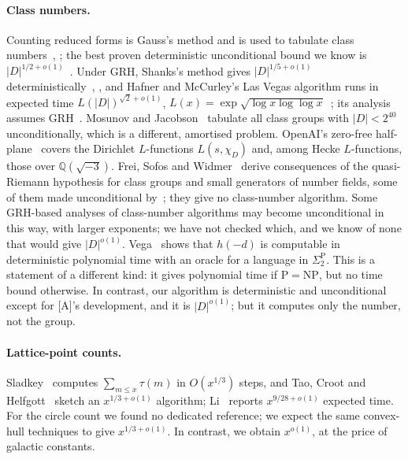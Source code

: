 \documentclass[10pt]{amsart}
\theoremstyle{plain}
\theoremstyle{definition}
\theoremstyle{remark}
\numberwithin{equation}{section}
\newcommand{\A}{\textup{[A]}}
\begin{document}
\paragraph{Class numbers.} Counting reduced forms is Gauss's method and is used to tabulate class
numbers~\cite[\S2]{Sch82}, \cite{Bue89}; the best proven deterministic unconditional bound we know is
$|D|^{1/2+o(1)}$~\cite[\S5]{Len92}. Under GRH, Shanks's method gives $|D|^{1/5+o(1)}$
deterministically~\cite{Len82,Sch82}, \cite[\S5.4]{Coh93}, and Hafner and McCurley's Las Vegas algorithm
runs in expected time $L(|D|)^{\sqrt2+o(1)}$, $L(x)=\exp\sqrt{\log x\log\log x}$~\cite{HM89}; its
analysis assumes GRH~\cite[\S5]{Len92}. Mosunov and Jacobson~\cite{MJ16} tabulate all class groups with
$|D|<2^{40}$ unconditionally, which is a different, amortised problem. OpenAI's zero-free
half-plane~\cite{OAI003} covers the Dirichlet $L$-functions $L(s,\chi_D)$ and, among Hecke $L$-functions,
those over $\mathbb{Q}(\sqrt{-3})$. Frei, Sofos and Widmer~\cite{FSW26} derive consequences of the
quasi-Riemann hypothesis for class groups and small generators of number fields, some of them made
unconditional by~\cite{OAI003}; they give no class-number algorithm. Some GRH-based analyses of
class-number algorithms may become unconditional in this way, with larger exponents; we have not checked
which, and we know of none that would give $|D|^{o(1)}$. Vega~\cite{Vega26} shows that $h(-d)$ is
computable in deterministic polynomial time with an oracle for a language in $\Sigma_2^{\mathrm P}$. This
is a statement of a different kind: it gives polynomial time if $\mathrm P=\mathrm{NP}$, but no time bound
otherwise. In contrast, our algorithm is deterministic and unconditional except for \A's development, and
it is $|D|^{o(1)}$; but it computes only the number, not the group.

\paragraph{Lattice-point counts.} Sladkey~\cite{Sla12} computes $\sum_{m\le x}\tau(m)$ in $O(x^{1/3})$ steps,
and Tao, Croot and Helfgott~\cite[\S2.1]{TCH12} sketch an $x^{1/3+o(1)}$ algorithm; Li~\cite{Li26} reports
$x^{9/28+o(1)}$ expected time. For the circle count we found no dedicated reference; we expect the
same convex-hull techniques to give $x^{1/3+o(1)}$. In contrast, we obtain $x^{o(1)}$, at the price of galactic
constants.
\end{document}
